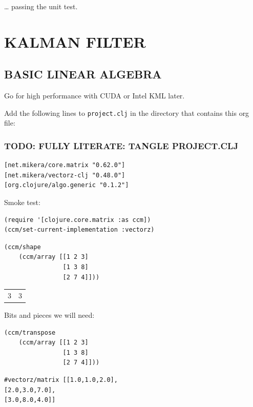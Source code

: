 \documentclass[10pt,oneside,x11names]{article}
\begin{document}
\ldots{}  passing the unit test.

\section{KALMAN FILTER}
\label{kalman-filter}
\subsection{BASIC LINEAR ALGEBRA}
\label{basic-linear-algebra}
Go for high performance with CUDA or Intel KML later.

Add the following lines to \texttt{project.clj} in the directory that contains this
org file:

\subsubsection{TODO: FULLY LITERATE: TANGLE PROJECT.CLJ}
\label{sec:org5b83d17}

\begin{verbatim}
[net.mikera/core.matrix "0.62.0"]
[net.mikera/vectorz-clj "0.48.0"]
[org.clojure/algo.generic "0.1.2"]
\end{verbatim}

Smoke test:

\begin{verbatim}
(require '[clojure.core.matrix :as ccm])
(ccm/set-current-implementation :vectorz)
\end{verbatim}

\begin{verbatim}
(ccm/shape
    (ccm/array [[1 2 3]
                [1 3 8]
                [2 7 4]]))
\end{verbatim}

\begin{center}
\begin{tabular}{rr}
3 & 3\\
\end{tabular}
\end{center}

Bits and pieces we will need:

\begin{verbatim}
(ccm/transpose
    (ccm/array [[1 2 3]
                [1 3 8]
                [2 7 4]]))
\end{verbatim}

\begin{verbatim}
#vectorz/matrix [[1.0,1.0,2.0],
[2.0,3.0,7.0],
[3.0,8.0,4.0]]
\end{verbatim}
\end{document}
